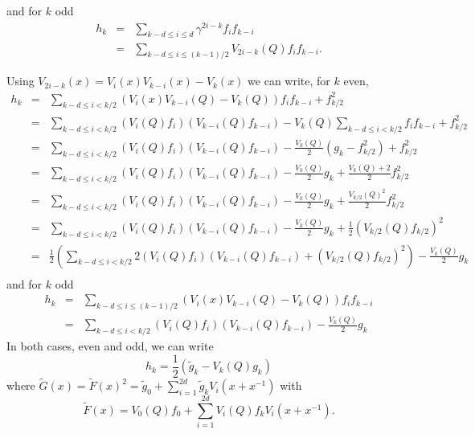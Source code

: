 \documentclass[a4paper]{article}
\begin{document}
and for $k$ odd
\begin{eqnarray*}
  h_k & = & \sum_{k-d \leq i \leq d} \gamma^{2i-k} f_i f_{k-i} \\ 
      & = & \sum_{k-d \leq i \leq (k-1)/2} V_{2i-k}(Q) f_i f_{k-i}.
\end{eqnarray*}

Using $V_{2i-k}(x) = V_i(x)V_{k-i}(x) - V_k(x)$ we can write, for $k$ even,
\begin{eqnarray*}
  h_k & = & \sum_{k-d \leq i < k/2} \left( V_i(x)V_{k-i}(Q) - V_k(Q) \right) f_i f_{k-i} +
            f_{k/2}^2 \\
      & = & \sum_{k-d \leq i < k/2} (V_i(Q) f_i) (V_{k-i}(Q) f_{k-i})
            - V_k(Q) \sum_{k-d \leq i < k/2} f_i f_{k-i}
            + f_{k/2}^2 \\
      & = & \sum_{k-d \leq i < k/2} (V_i(Q) f_i) (V_{k-i}(Q) f_{k-i})
            - \frac{V_k(Q)}{2} (g_k - f_{k/2}^2)
            + f_{k/2}^2 \\
      & = & \sum_{k-d \leq i < k/2} (V_i(Q) f_i) (V_{k-i}(Q) f_{k-i})
            - \frac{V_k(Q)}{2} g_k 
            + \frac{V_k(Q) + 2}{2} f_{k/2}^2 \\
      & = & \sum_{k-d \leq i < k/2} (V_i(Q) f_i) (V_{k-i}(Q) f_{k-i})
            - \frac{V_k(Q)}{2} g_k 
            + \frac{V_{k/2}(Q)^2}{2} f_{k/2}^2 \\
      & = & \sum_{k-d \leq i < k/2} (V_i(Q) f_i) (V_{k-i}(Q) f_{k-i})
            - \frac{V_k(Q)}{2} g_k 
            + \frac{1}{2} ( V_{k/2}(Q) f_{k/2} )^2  \\
      & = & \frac{1}{2} \left(
            \sum_{k-d \leq i < k/2} 2 (V_i(Q) f_i) (V_{k-i}(Q) f_{k-i})
            + ( V_{k/2}(Q) f_{k/2} )^2 \right)
            - \frac{V_k(Q)}{2} g_k \\
\end{eqnarray*}
and for $k$ odd
\begin{eqnarray*}
  h_k & = & \sum_{k-d \leq i \leq (k-1)/2} (V_i(x)V_{k-i}(Q) - V_k(Q)) f_i f_{k-i} \\
      & = & \sum_{k-d \leq i < k/2} (V_i(Q) f_i) (V_{k-i}(Q) f_{k-i})
            - \frac{V_k(Q)}{2} g_k
\end{eqnarray*}
In both cases, even and odd, we can write 
\begin{equation}
 h_k = \frac{1}{2} (\tilde{g}_k - V_k(Q)g_k)
\end{equation}
where 
$\tilde{G}(x) = \tilde{F}(x)^2 = \tilde{g}_0 + \sum_{i=1}^{2d} \tilde{g}_k
V_i(x+x^{-1})$ with
\begin{displaymath}
\tilde{F}(x) = V_0(Q) f_0 + \sum_{i=1}^{2d} V_i(Q) f_k V_i(x+x^{-1}).
\end{displaymath}
\end{document}
